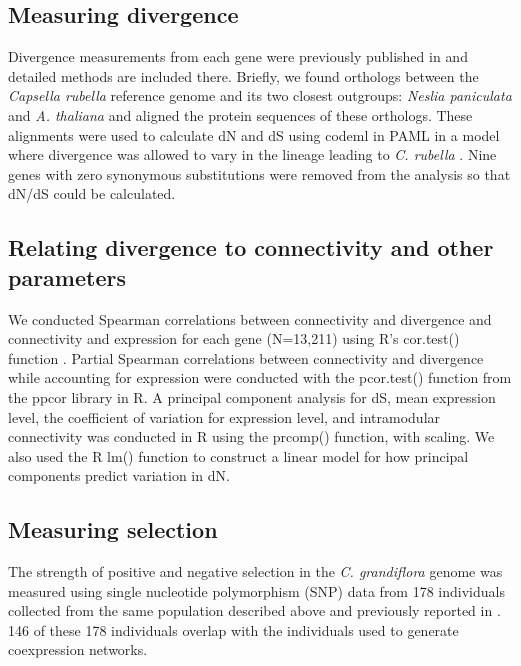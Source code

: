 \subsection{Measuring divergence}
Divergence measurements from each gene were previously published in \citep{Williamson2014-tf} and detailed methods are included there. Briefly, we found orthologs between the \textit{Capsella rubella} reference genome and its two closest outgroups: \textit{Neslia paniculata} and \textit{A. thaliana} and aligned the protein sequences of these orthologs. These alignments were used to calculate dN and dS using codeml in PAML in a model where divergence was allowed to vary in the lineage leading to \textit{C. rubella} \citep{Yang2007-rs}. Nine genes with zero synonymous substitutions were removed from the analysis so that dN/dS could be calculated.

\subsection{Relating divergence to connectivity and other parameters}
We conducted Spearman correlations between connectivity and divergence and connectivity and expression for each gene (N=13,211) using R’s cor.test() function \citep{r}. Partial Spearman correlations between connectivity and divergence while accounting for expression were conducted with the pcor.test() function from the ppcor library in R. A principal component analysis for dS, mean expression level, the coefficient of variation for expression level, and intramodular connectivity was conducted in R using the prcomp() function, with scaling. We also used the R lm() function to construct a linear model for how principal components predict variation in dN.

\subsection{Measuring selection}
The strength of positive and negative selection in the \textit{C. grandiflora} genome was measured using single nucleotide polymorphism (SNP) data from 178 individuals collected from the same population described above and previously reported in \citep{Josephs2015-nx,Sicard2015-uc}. 146 of these 178 individuals overlap with the individuals used to generate coexpression networks.

